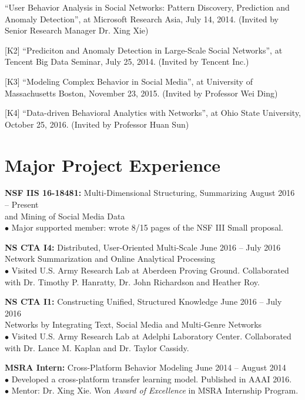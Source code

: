 \documentclass[margin, 10pt]{res}
\begin{document}
\begin{resume}
[K1] ``User Behavior Analysis in Social Networks: Pattern Discovery, Prediction and Anomaly Detection'', at Microsoft Research Asia, July 14, 2014. (Invited by Senior Research Manager Dr. Xing Xie)

[K2] ``Prediciton and Anomaly Detection in Large-Scale Social Networks'', at Tencent Big Data Seminar, July 25, 2014. (Invited by Tencent Inc.)

[K3] ``Modeling Complex Behavior in Social Media'', at University of Massachusetts Boston, November 23, 2015. (Invited by Professor Wei Ding)

[K4] ``Data-driven Behavioral Analytics with Networks'', at Ohio State University, October 25, 2016. (Invited by Professor Huan Sun)


\section{Major Project Experience}

{\textbf{NSF IIS 16-18481:} Multi-Dimensional Structuring, Summarizing} \hfill{August 2016 -- Present} \\
{and Mining of Social Media Data} \\
$\bullet$ Major supported member: wrote 8/15 pages of the NSF III Small proposal.

{\textbf{NS CTA I4:} Distributed, User-Oriented Multi-Scale} \hfill{June 2016 -- July 2016} \\
{Network Summarization and Online Analytical Processing} \\
$\bullet$ Visited U.S. Army Research Lab at Aberdeen Proving Ground.
Collaborated with Dr. Timothy P. Hanratty, Dr. John Richardson and Heather Roy.

{\textbf{NS CTA I1:} Constructing Unified, Structured Knowledge} \hfill{June 2016 -- July 2016} \\
{Networks by Integrating Text, Social Media and Multi-Genre Networks} \hfill{} \\
$\bullet$ Visited U.S. Army Research Lab at Adelphi Laboratory Center. Collaborated with Dr. Lance M. Kaplan and Dr. Taylor Cassidy.

{\textbf{MSRA Intern:} Cross-Platform Behavior Modeling} \hfill{June 2014 -- August 2014} \\
$\bullet$ Developed a cross-platform transfer learning model. Published in AAAI 2016. \\
$\bullet$ Mentor: Dr. Xing Xie. Won \textit{Award of Excellence} in MSRA Internship Program.


\end{resume}
\end{document}
